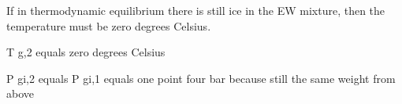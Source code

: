 If in thermodynamic equilibrium there is still ice in the EW mixture, then the temperature must be zero degrees Celsius.

T g,2 equals zero degrees Celsius

P gi,2 equals P gi,1 equals one point four bar because still the same weight from above